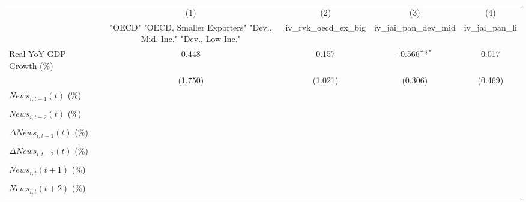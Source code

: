 {
\def\sym#1{\ifmmode^{#1}\else\(^{#1}\)\fi}
\begin{tabular}{l*{4}{c}}
\toprule
                    &\multicolumn{1}{c}{(1)}&\multicolumn{1}{c}{(2)}&\multicolumn{1}{c}{(3)}&\multicolumn{1}{c}{(4)}\\
                    &\multicolumn{1}{c}{ "OECD" "OECD, Smaller Exporters" "Dev., Mid.-Inc." "Dev., Low-Inc."}&\multicolumn{1}{c}{iv_rvk_oecd_ex_big}&\multicolumn{1}{c}{iv_jai_pan_dev_mid}&\multicolumn{1}{c}{iv_jai_pan_li}\\
\midrule
Real YoY GDP Growth (\%)&       0.448         &       0.157         &      -0.566\sym{*}  &       0.017         \\
                    &     (1.750)         &     (1.021)         &     (0.306)         &     (0.469)         \\
\addlinespace
$ News_{i,t-1}(t)$ (\%)&                     &                     &                     &                     \\
                    &                     &                     &                     &                     \\
\addlinespace
$ News_{i,t-2}(t)$ (\%)&                     &                     &                     &                     \\
                    &                     &                     &                     &                     \\
\addlinespace
$ \Delta News_{i,t-1}(t)$ (\%)&                     &                     &                     &                     \\
                    &                     &                     &                     &                     \\
\addlinespace
$ \Delta News_{i,t-2}(t)$ (\%)&                     &                     &                     &                     \\
                    &                     &                     &                     &                     \\
\addlinespace
$ News_{i,t}(t+1)$ (\%)&                     &                     &                     &                     \\
                    &                     &                     &                     &                     \\
\addlinespace
$ News_{i,t}(t+2)$ (\%)&                     &                     &                     &                     \\

\end{tabular}}
